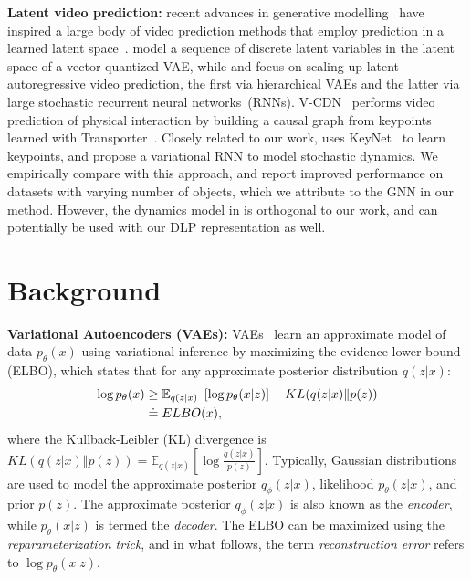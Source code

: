 \documentclass[nohyperref]{article}
\theoremstyle{plain}
\theoremstyle{definition}
\theoremstyle{remark}
\begin{document}
\textbf{Latent video prediction:} recent advances in generative modelling~\citep[e.g.,][]{razavi2019vqvqae, karras2020analyzing, daniel2020soft} have inspired a large body of video prediction methods that employ prediction in a learned latent space~\citep{minderer2019unsupervised, wu2021greedy, walker2021predicting, villegas2019high, yan2021videogpt}. \citet{walker2021predicting, yan2021videogpt} model a sequence of discrete latent variables in the latent space of a vector-quantized VAE, while \citet{wu2021greedy} and \citet{villegas2019high} focus on scaling-up latent autoregressive video prediction, the first via hierarchical VAEs and the latter via large stochastic recurrent neural networks~(RNNs). V-CDN~\citep{li2020causal} performs video prediction of physical interaction by building a causal graph from keypoints learned with Transporter~\citep{kulkarni2019transporter}.
Closely related to our work, \citet{minderer2019unsupervised} uses KeyNet~\citep{jakab2018unsupervised} to learn keypoints, and propose a variational RNN to model stochastic dynamics. We empirically compare with this approach, and report improved performance on datasets with varying number of objects, which we attribute to the GNN in our method. However, the 
dynamics model in \citet{minderer2019unsupervised} is orthogonal to our work, and can potentially be used with our DLP representation as well.




\section{Background}
\label{sec:bg}
\textbf{Variational Autoencoders (VAEs):} VAEs~\citep{kingma2014autoencoding} learn an approximate model of data $p_{\theta}(x)$ using variational inference by maximizing the evidence lower bound (ELBO), which states that for any approximate posterior distribution $q(z|x)$: 
\begin{equation}\label{eq:ELBO_def}
\begin{split}
    \log p_\theta(x) &\geq \mathbb{E}_{q(z|x)}\ \left[\log p_\theta(x|z)\right] - KL(q(z|x) \Vert p(z)) \\
    & \doteq ELBO(x), \raisetag{1.5em}
\end{split}
\end{equation}
where the Kullback-Leibler (KL) divergence is
$KL(q(z|x) \Vert p(z)) = \mathbb{E}_{q(z|x)} \left[ \log \frac{q(z|x)}{p(z)} \right]$. Typically, Gaussian distributions are used to model the approximate posterior $q_{\phi}(z|x)$, likelihood $p_{\theta}(z|x)$, and prior $p(z)$. The approximate posterior $q_\phi(z|x)$ is also known as the \emph{encoder}, while $p_\theta(x|z)$ is termed the \emph{decoder}. The ELBO can be maximized using the \textit{reparameterization trick}, and in what follows, the term \textit{reconstruction error} refers to $\log p_\theta(x|z)$.
\end{document}
